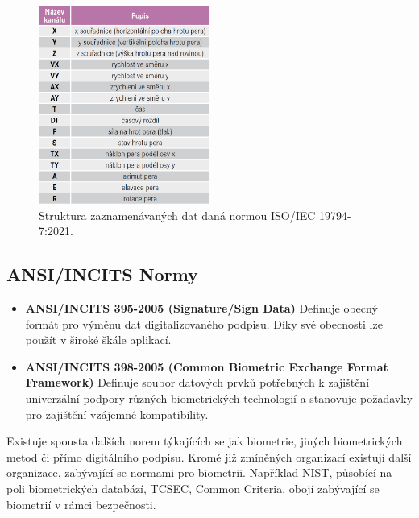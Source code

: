 \begin{figure}[h]
  \centering
  \includegraphics[width=0.5\textwidth]{obrazky-figures/normy.png}
  \caption{Struktura zaznamenávaných dat daná normou ISO/IEC 19794-7:2021.} %
  \label{fig:norms_table}
\end{figure}

\subsection*{ANSI/INCITS Normy}
\begin{itemize}
  \item \textbf{ANSI/INCITS 395-2005 (Signature/Sign Data)}  
  Definuje obecný formát pro výměnu dat digitalizovaného podpisu. Díky své obecnosti lze použít v široké škále aplikací. %
  
  \item \textbf{ANSI/INCITS 398-2005 (Common Biometric Exchange Format Framework)}  
  Definuje soubor datových prvků potřebných k zajištění univerzální podpory různých biometrických technologií a stanovuje požadavky pro zajištění vzájemné kompatibility. %
\end{itemize}

Existuje spousta dalších norem týkajících se jak biometrie, jiných biometrických metod či přímo digitálního podpisu.                %
Kromě již zmíněných organizací existují další organizace, zabývající se normami pro biometrii.                                      %
Například NIST, působící na poli biometrických databází, TCSEC, Common Criteria, obojí zabývající se biometrií v rámci bezpečnosti. %

